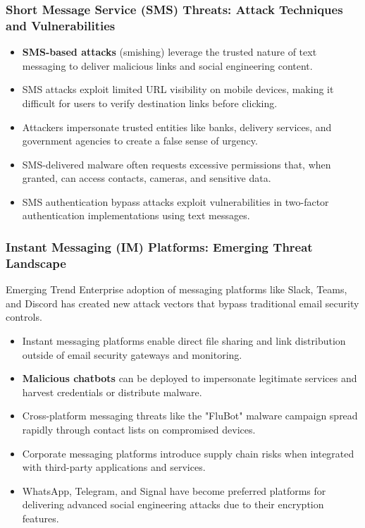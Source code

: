 \documentclass{beamer}
\begin{document}
\begin{frame}
    \frametitle{Short Message Service (SMS) Threats: Attack Techniques and Vulnerabilities}
    
    \begin{itemize}
        \item \textbf{SMS-based attacks} (smishing) leverage the trusted nature of text messaging to deliver malicious links and social engineering content.
        \item SMS attacks exploit limited URL visibility on mobile devices, making it difficult for users to verify destination links before clicking.
        \item Attackers impersonate trusted entities like banks, delivery services, and government agencies to create a false sense of urgency.
        \item SMS-delivered malware often requests excessive permissions that, when granted, can access contacts, cameras, and sensitive data.
        \item SMS authentication bypass attacks exploit vulnerabilities in two-factor authentication implementations using text messages.
    \end{itemize}
\end{frame}

\begin{frame}
    \frametitle{Instant Messaging (IM) Platforms: Emerging Threat Landscape}
    
    \begin{alertblock}{Emerging Trend}
        Enterprise adoption of messaging platforms like Slack, Teams, and Discord has created new attack vectors that bypass traditional email security controls.
    \end{alertblock}
    
    \begin{itemize}
        \item Instant messaging platforms enable direct file sharing and link distribution outside of email security gateways and monitoring.
        \item \textbf{Malicious chatbots} can be deployed to impersonate legitimate services and harvest credentials or distribute malware.
        \item Cross-platform messaging threats like the "FluBot" malware campaign spread rapidly through contact lists on compromised devices.
        \item Corporate messaging platforms introduce supply chain risks when integrated with third-party applications and services.
        \item WhatsApp, Telegram, and Signal have become preferred platforms for delivering advanced social engineering attacks due to their encryption features.
    \end{itemize}
\end{frame}
\end{document}
